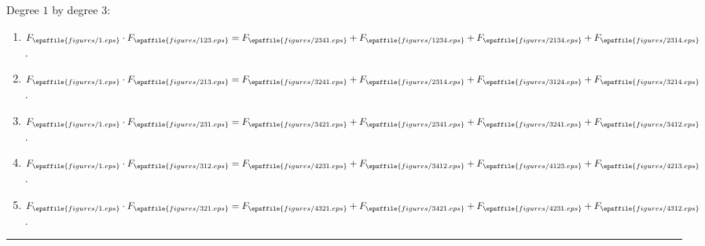 \documentclass[12pt]{article}
\begin{document}
\hspace{-50pt}{\bf Products of total degree $4$:}

\hspace{-40pt}Degree $1$ by degree $3$:\vspace{-1pt}
\begin{enumerate}
\item[]\hspace{-50pt}$ F_{\epsffile{figures/1.eps}}\cdot F_{\epsffile{figures/123.eps}}=
         F_{\epsffile{figures/2341.eps}}+ F_{\epsffile{figures/1234.eps}}+ F_{\epsffile{figures/2134.eps}}+ F_{\epsffile{figures/2314.eps}}$.\vspace{-8pt}
\item[]\hspace{-50pt}$ F_{\epsffile{figures/1.eps}}\cdot F_{\epsffile{figures/213.eps}}=
         F_{\epsffile{figures/3241.eps}}+ F_{\epsffile{figures/2314.eps}}+ F_{\epsffile{figures/3124.eps}}+ F_{\epsffile{figures/3214.eps}}$.\vspace{-8pt}
\item[]\hspace{-50pt}$ F_{\epsffile{figures/1.eps}}\cdot F_{\epsffile{figures/231.eps}}=
         F_{\epsffile{figures/3421.eps}}+ F_{\epsffile{figures/2341.eps}}+ F_{\epsffile{figures/3241.eps}}+ F_{\epsffile{figures/3412.eps}}$.\vspace{-8pt}
\item[]\hspace{-50pt}$ F_{\epsffile{figures/1.eps}}\cdot F_{\epsffile{figures/312.eps}}=
         F_{\epsffile{figures/4231.eps}}+ F_{\epsffile{figures/3412.eps}}+ F_{\epsffile{figures/4123.eps}}+ F_{\epsffile{figures/4213.eps}}$.\vspace{-8pt}
\item[]\hspace{-50pt}$ F_{\epsffile{figures/1.eps}}\cdot F_{\epsffile{figures/321.eps}}=
         F_{\epsffile{figures/4321.eps}}+ F_{\epsffile{figures/3421.eps}}+ F_{\epsffile{figures/4231.eps}}+ F_{\epsffile{figures/4312.eps}}$.\vspace{-8pt}
\end{enumerate}
\hspace{-40pt}\rule{430pt}{1pt}
\end{document}
